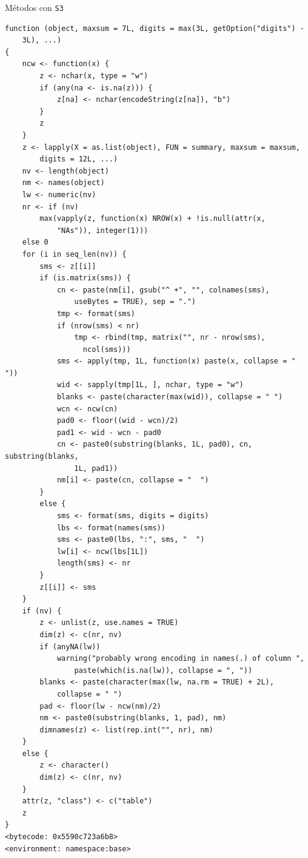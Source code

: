 \documentclass[xcolor={usenames,svgnames,dvipsnames}]{beamer}
\begin{document}
\begin{frame}[label={sec:org4c6376d},fragile]{Métodos con \texttt{S3}}
\begin{verbatim}
function (object, maxsum = 7L, digits = max(3L, getOption("digits") - 
    3L), ...) 
{
    ncw <- function(x) {
        z <- nchar(x, type = "w")
        if (any(na <- is.na(z))) {
            z[na] <- nchar(encodeString(z[na]), "b")
        }
        z
    }
    z <- lapply(X = as.list(object), FUN = summary, maxsum = maxsum, 
        digits = 12L, ...)
    nv <- length(object)
    nm <- names(object)
    lw <- numeric(nv)
    nr <- if (nv) 
        max(vapply(z, function(x) NROW(x) + !is.null(attr(x, 
            "NAs")), integer(1)))
    else 0
    for (i in seq_len(nv)) {
        sms <- z[[i]]
        if (is.matrix(sms)) {
            cn <- paste(nm[i], gsub("^ +", "", colnames(sms), 
                useBytes = TRUE), sep = ".")
            tmp <- format(sms)
            if (nrow(sms) < nr) 
                tmp <- rbind(tmp, matrix("", nr - nrow(sms), 
                  ncol(sms)))
            sms <- apply(tmp, 1L, function(x) paste(x, collapse = "  "))
            wid <- sapply(tmp[1L, ], nchar, type = "w")
            blanks <- paste(character(max(wid)), collapse = " ")
            wcn <- ncw(cn)
            pad0 <- floor((wid - wcn)/2)
            pad1 <- wid - wcn - pad0
            cn <- paste0(substring(blanks, 1L, pad0), cn, substring(blanks, 
                1L, pad1))
            nm[i] <- paste(cn, collapse = "  ")
        }
        else {
            sms <- format(sms, digits = digits)
            lbs <- format(names(sms))
            sms <- paste0(lbs, ":", sms, "  ")
            lw[i] <- ncw(lbs[1L])
            length(sms) <- nr
        }
        z[[i]] <- sms
    }
    if (nv) {
        z <- unlist(z, use.names = TRUE)
        dim(z) <- c(nr, nv)
        if (anyNA(lw)) 
            warning("probably wrong encoding in names(.) of column ", 
                paste(which(is.na(lw)), collapse = ", "))
        blanks <- paste(character(max(lw, na.rm = TRUE) + 2L), 
            collapse = " ")
        pad <- floor(lw - ncw(nm)/2)
        nm <- paste0(substring(blanks, 1, pad), nm)
        dimnames(z) <- list(rep.int("", nr), nm)
    }
    else {
        z <- character()
        dim(z) <- c(nr, nv)
    }
    attr(z, "class") <- c("table")
    z
}
<bytecode: 0x5590c723a6b8>
<environment: namespace:base>
\end{verbatim}
\end{frame}
\end{document}
